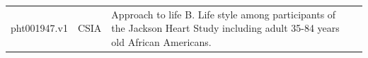 \documentclass[11pt]{article}
\begin{document}
\begin{tabular}{r|lll}
	 pht001947.v1                                                                                                                                                                                                                                                                                                                                                                                                                                                                                                                                                                                                                                                                                                                                                                                                                                                                                                                                                                                  & CSIA                                                                                                                                                                                                                                                                                                                                                                                                                                                                                                                                                                                                                                                                                                                                                                                                                                                                                                                                                                                          & Approach to life B. Life style among participants of the Jackson Heart Study including adult 35-84 years old African Americans.                                                                                                                                                                                                                                                                                                                                                                                                                                                                                                                                                                                                                                                                                                                                                                                                                                                              \\

\end{tabular}
\end{document}
